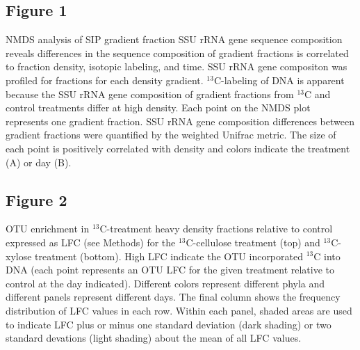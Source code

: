 \subsection{Figure 1}
NMDS analysis of SIP gradient fraction SSU rRNA gene sequence composition reveals
differences in the sequence composition of gradient fractions is correlated to
fraction density, isotopic labeling, and time. SSU rRNA gene compositon was
profiled for fractions for each density gradient. $^{13}$C-labeling of DNA is
apparent because the SSU rRNA gene composition of gradient fractions from
$^{13}$C and control treatments differ at high density. Each point on the NMDS
plot represents one gradient fraction. SSU rRNA gene composition differences
between gradient fractions were quantified by the weighted Unifrac metric. The
size of each point is positively correlated with density and colors indicate
the treatment (A) or day (B).
\subsection{Figure 2}
OTU enrichment in $^{13}$C-treatment heavy density fractions relative to
control expressed as LFC (see Methods) for the $^{13}$C-cellulose treatment
(top) and $^{13}$C-xylose treatment (bottom). High LFC indicate the OTU
incorporated $^{13}$C into DNA (each point represents an OTU LFC for the given
treatment relative to control at the day indicated). Different colors
represent different phyla and different panels represent different days. The
final column shows the frequency distribution of LFC values in each row. Within
each panel, shaded areas are used to indicate LFC plus or minus one standard
deviation (dark shading) or two standard devations (light shading) about the
mean of all LFC values.
    
    
